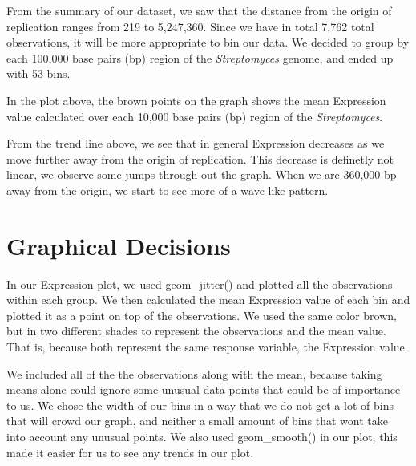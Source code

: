 \documentclass[12pt,]{article}
\begin{document}
From the summary of our dataset, we saw that the distance from the
origin of replication ranges from 219 to 5,247,360. Since we have in
total 7,762 total observations, it will be more appropriate to bin our
data. We decided to group by each 100,000 base pairs (bp) region of the
\textit{Streptomyces}\xspace genome, and ended up with 53 bins.

In the plot above, the brown points on the graph shows the mean
Expression value calculated over each 10,000 base pairs (bp) region of
the \textit{Streptomyces}\xspacegenome.

From the trend line above, we see that in general Expression decreases
as we move further away from the origin of replication. This decrease is
definetly not linear, we observe some jumps through out the graph. When
we are 360,000 bp away from the origin, we start to see more of a
wave-like pattern.

\hypertarget{graphical-decisions}{%
\section{Graphical Decisions}\label{graphical-decisions}}

In our Expression plot, we used geom\_jitter() and plotted all the
observations within each group. We then calculated the mean Expression
value of each bin and plotted it as a point on top of the observations.
We used the same color brown, but in two different shades to represent
the observations and the mean value. That is, because both represent the
same response variable, the Expression value.

We included all of the the observations along with the mean, because
taking means alone could ignore some unusual data points that could be
of importance to us. We chose the width of our bins in a way that we do
not get a lot of bins that will crowd our graph, and neither a small
amount of bins that wont take into account any unusual points. We also
used geom\_smooth() in our plot, this made it easier for us to see any
trends in our plot.
\end{document}
